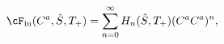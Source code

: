 \begin{equation}\label{Fisasum}
\cF_{\rm in}(C^a,\hat{S},T_{+})=\sum_{n=0}^{\infty}
H_{n}(\hat{S},T_{+}) (C^a C^a )^n,
\end{equation}

